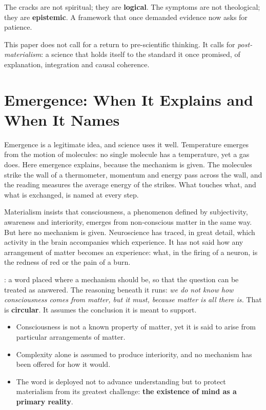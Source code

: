 \documentclass[11pt,a4paper]{article}
\begin{document}
The cracks are not spiritual; they are \textbf{logical}. The symptoms are not theological; they are \textbf{epistemic}. A framework that once demanded evidence now asks for patience.

This paper does not call for a return to pre-scientific thinking. It calls for \textit{post-materialism}: a science that holds itself to the standard it once promised, of explanation, integration and causal coherence.

\section{Emergence: When It Explains and When It Names}
\label{sec:emergence}

Emergence is a legitimate idea, and science uses it well. Temperature emerges from the motion of molecules: no single molecule has a temperature, yet a gas does. Here emergence explains, because the mechanism is given. The molecules strike the wall of a thermometer, momentum and energy pass across the wall, and the reading measures the average energy of the strikes. What touches what, and what is exchanged, is named at every step.

Materialism insists that consciousness, a phenomenon defined by subjectivity, awareness and interiority, emerges from non-conscious matter in the same way. But here no mechanism is given. Neuroscience has traced, in great detail, which activity in the brain accompanies which experience. It has not said how any arrangement of matter becomes an experience: what, in the firing of a neuron, is the redness of red or the pain of a burn.

: a word placed where a mechanism should be, so that the question can be treated as answered. The reasoning beneath it runs: \textit{we do not know how consciousness comes from matter, but it must, because matter is all there is.} That is \textbf{circular}. It assumes the conclusion it is meant to support.
\begin{itemize}
  \item Consciousness is not a known property of matter, yet it is said to arise from particular arrangements of matter.
  \item Complexity alone is assumed to produce interiority, and no mechanism has been offered for how it would.
  \item The word is deployed not to advance understanding but to protect materialism from its greatest challenge: \textbf{the existence of mind as a primary reality}.
\end{itemize}
\end{document}
